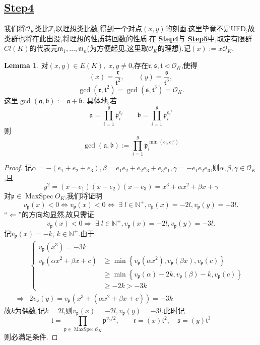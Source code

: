 \documentclass[12pt,A4paper,oneside,reqno]{amsart}
\numberwithin{equation}{section}
\theoremstyle{definition}
\newtheorem{lemma}[theorem]{Lemma}
\theoremstyle{plain}
\theoremstyle{plain}
\numberwithin{equation}{section}
\theoremstyle{remark}
\newcommand{\MaxSpec}{\operatorname{MaxSpec}}
\begin{document}
\subsection*{\underline{Step4}}
我们将$\mathcal{O}_K$类比$\mathbb{Z}$,以理想类比数,得到一个对点$(x,y)$的刻画.这里毕竟不是UFD,故类群也将在此出没,将理想的性质转回数的性质.在 \textbf{\underline{Step4}}与 \textbf{\underline{Step5}}中,取定有限群$Cl(K)$的代表元$\mathfrak{m}_1,\ldots , \mathfrak{m}_n$(为方便起见,这里取$\mathcal{O}_K$的理想).记$(x):=x \mathcal{O}_K$.
\begin{lemma}\label{lem:value2&3ideal}
	对$(x,y) \in E(K), \;x,y\neq 0$,存在$\mathfrak{r},\mathfrak{s},\mathfrak{t} \vartriangleleft \mathcal{O}_K$,使得
	$$(x)=\frac{\mathfrak{r}}{\mathfrak{t}^2}, \qquad (y)=\frac{\mathfrak{s}}{\mathfrak{t}^3}, $$
	$$\gcd(\mathfrak{r},\mathfrak{t}^2)=\gcd (\mathfrak{s},\mathfrak{t}^3)=\mathcal{O}_K.$$
	这里$\gcd(\mathfrak{a},\mathfrak{b}):=\mathfrak{a}+\mathfrak{b}$. 具体地,若
	$$\mathfrak{a}=\prod_{i=1}^{g}\mathfrak{p}_i^{e_i} \qquad \mathfrak{b}=\prod_{i=1}^{g}\mathfrak{p}_i^{e_i'}$$
	则$$\gcd(\mathfrak{a},\mathfrak{b}):=\prod_{i=1}^{g}\mathfrak{p}_i^{\min (e_i,e_i')}$$
\end{lemma}
\begin{proof}
	记$\alpha=-(e_1+e_2+e_3), \beta=e_1e_2+e_2e_3+e_3e_1, \gamma =-e_1e_2e_3$,则$\alpha,\beta,\gamma \in \mathcal{O}_K$,且
	$$y^2=(x-e_1)(x-e_2)(x-e_3)=x^3+\alpha x^2 +\beta x+ \gamma$$
	对$\mathfrak{p} \in \MaxSpec O_K$,我们将证明
	$$v_{\mathfrak{p}}(x)<0 \Longleftrightarrow v_{\mathfrak{p}}(x)<0 \Longleftrightarrow \;\exists \; l \in \mathbb{N}^+, v_{\mathfrak{p}}(x)=-2l, v_{\mathfrak{p}}(y)=-3l. $$	
	“$\Longleftarrow$”的方向均显然,故只需证
	$$v_{\mathfrak{p}}(x)<0 \Longrightarrow \;\exists \; l \in \mathbb{N}^+, v_{\mathfrak{p}}(x)=-2l, v_{\mathfrak{p}}(y)=-3l.$$
	记$v_{\mathfrak{p}}(x)=-k$, $k \in \mathbb{N}^+$.由于
	\begin{equation*}
	\begin{aligned}
	&\begin{cases}
	v_{\mathfrak{p}}(x^3)=-3k&\\
	v_{\mathfrak{p}}(\alpha x^2+\beta x+ c)&\geqslant \min \left\{v_{\mathfrak{p}}(\alpha x^2),v_{\mathfrak{p}}(\beta x),v_{\mathfrak{p}}(c)\right\}\\
	&\geqslant \min \left\{v_{\mathfrak{p}}(\alpha )-2k,v_{\mathfrak{p}}(\beta)-k,v_{\mathfrak{p}}(c)\right\}\\
	&\geqslant -2k>-3k
	\end{cases}\\
	\Longrightarrow & 2v_{\mathfrak{p}}(y)=v_{\mathfrak{p}}(x^3+(\alpha x^2+\beta x+ c))=-3k
	\end{aligned}
	\end{equation*}
	故$k$为偶数,记$k=2l$,则$v_{\mathfrak{p}}(x)=-2l,v_{\mathfrak{p}}(y)=-3l$.此时记
	$$\mathfrak{t}=\prod_{\mathfrak{p} \in \MaxSpec \mathcal{O}_K}\mathfrak{p}^{v_{\mathfrak{p}}/2},\qquad \mathfrak{r}=(x)\mathfrak{t}^2,\quad \mathfrak{s}=(y)\mathfrak{t}^3$$
	则必满足条件.
\end{proof}
\end{document}
